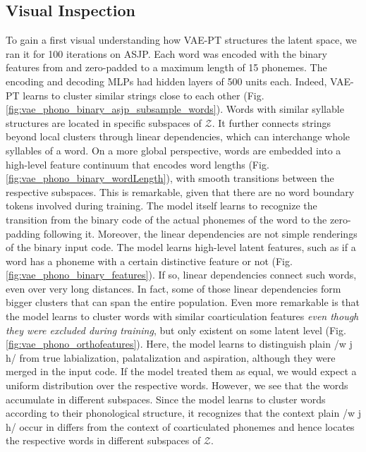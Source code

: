 \documentclass[6pt]{article}
\begin{document}
\subsection{Visual Inspection}
To gain a first visual understanding how VAE-PT structures the latent space, we ran it for 100 iterations on ASJP. Each word was encoded with the binary features from \cite{rama2016siamese} and zero-padded to a maximum length of 15 phonemes. The encoding and decoding MLPs had hidden layers of 500 units each.
Indeed, VAE-PT learns to cluster similar strings close to each other (Fig. \ref{fig:vae_phono_binary_asjp_subsample_words}). Words with similar syllable structures are located in specific subspaces of $\mathcal{Z}$. It further connects strings beyond local clusters through linear dependencies, which can interchange whole syllables of a word. 
On a more global perspective, words are embedded into a high-level feature continuum that encodes word lengths (Fig. \ref{fig:vae_phono_binary_wordLength}), with smooth transitions between the respective subspaces. This is remarkable, given that there are no word boundary tokens involved during training. The model itself learns to recognize the transition from the binary code of the actual phonemes of the word to the zero-padding following it.
Moreover, the linear dependencies are not simple renderings of the binary input code. The model learns high-level latent features, such as if a word has a phoneme with a certain distinctive feature or not (Fig. \ref{fig:vae_phono_binary_features}). If so, linear dependencies connect such words, even over very long distances. In fact, some of those linear dependencies form bigger clusters that can span the entire population. 
Even more remarkable is that the model learns to cluster words with similar coarticulation features \textit{even though they were excluded during training}, but only existent on some latent level (Fig. \ref{fig:vae_phono_orthofeatures}). Here, the model learns to distinguish plain /w j h/ from true labialization, palatalization and aspiration, although they were merged in the input code. If the model treated them as equal, we would expect a uniform distribution over the respective words. However, we see that the words accumulate in different subspaces. Since the model learns to cluster words according to their phonological structure, it recognizes that the context plain /w j h/ occur in differs from the context of coarticulated phonemes and hence locates the respective words in different subspaces of $\mathcal{Z}$.
\end{document}
